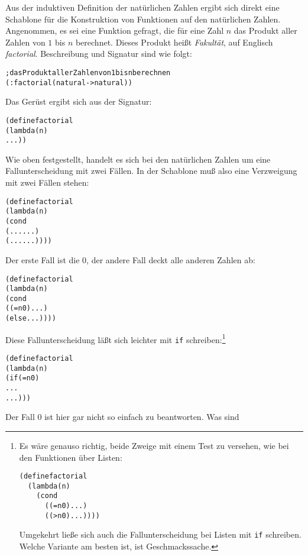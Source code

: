 Aus der induktiven Definition der natürlichen Zahlen ergibt sich direkt eine Schablone für die
Konstruktion von Funktionen auf den natürlichen Zahlen.  Angenommen,
es sei eine Funktion gefragt, die für eine Zahl $n$ das Produkt aller
Zahlen von $1$ bis $n$ berechnet. 
Dieses Produkt heißt 
\textit{Fakultät}, auf Englisch
\textit{factorial}. 
  Beschreibung und Signatur sind wie folgt:
%
\begin{alltt}
; das Produkt aller Zahlen von 1 bis n berechnen
(: factorial (natural -> natural))
\end{alltt}
\label{page:factorial}
%
Das Gerüst ergibt sich aus der Signatur:
%
\begin{alltt}
(define factorial
  (lambda (n)
    ...))
\end{alltt}
%
Wie oben festgestellt, handelt es sich bei den natürlichen Zahlen um
eine Fallunterscheidung mit zwei Fällen.  In der Schablone muß also
eine Verzweigung mit zwei Fällen stehen:
%
\begin{alltt}
(define factorial
  (lambda (n)
    (cond
      (... ...)
      (... ...))))
\end{alltt}
%
Der erste Fall ist die $0$, der andere Fall deckt alle anderen Zahlen
ab:
%
\begin{alltt}
(define factorial
  (lambda (n)
    (cond
      ((= n 0) ...)
      (else ...))))
\end{alltt}
%
Diese Fallunterscheidung läßt sich leichter mit \texttt{if}
schreiben:\footnote{Es wäre genauso richtig, beide Zweige
  mit einem Test zu versehen, wie bei den Funktionen über Listen:
%
\begin{alltt}
(define factorial\\
\hspace*{0em}~~(lambda (n)\\
\hspace*{0em}~~~~(cond\\
\hspace*{0em}~~~~~~((= n 0) ...)\\
\hspace*{0em}~~~~~~((> n 0) ...))))
\end{alltt}
%
Umgekehrt ließe sich auch die Fallunterscheidung bei 
Listen mit \texttt{if} schreiben.  Welche
Variante am besten ist, ist Geschmackssache.}
%
\begin{alltt}
(define factorial
  (lambda (n)
    (if (= n 0)
        ...
        ...)))
\end{alltt}
%
Der Fall $0$ ist hier gar nicht so einfach zu beantworten.  Was sind
